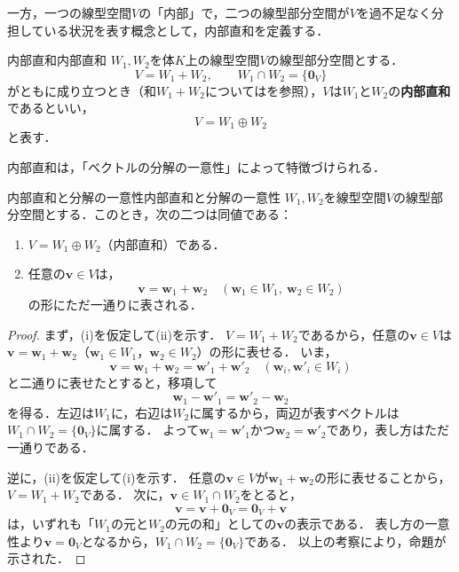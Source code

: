 一方，一つの線型空間$V$の「内部」で，二つの線型部分空間が$V$を過不足なく分担している状況を表す概念として，内部直和を定義する．

\begin{definition}{内部直和}{内部直和}
  $W_1, W_2$を体$K$上の線型空間$V$の線型部分空間とする．
  \[
    V = W_1 + W_2,
    \qquad
    W_1 \cap W_2 = \{\bm{0}_V\}
  \]
  がともに成り立つとき（和$W_1 + W_2$についてはを参照），$V$は$W_1$と$W_2$の\textbf{内部直和}であるといい，
  \[
    V = W_1 \oplus W_2
  \]
  と表す．
\end{definition}

内部直和は，「ベクトルの分解の一意性」によって特徴づけられる．

\begin{prop}{内部直和と分解の一意性}{内部直和と分解の一意性}
  $W_1, W_2$を線型空間$V$の線型部分空間とする．このとき，次の二つは同値である：
  \begin{enumerate}[label=(\roman*),leftmargin=3.2em]
    \item $V = W_1 \oplus W_2$（内部直和）である．
    \item 任意の$\bm{v} \in V$は，
    \[
      \bm{v} = \bm{w}_1 + \bm{w}_2
      \quad (\bm{w}_1 \in W_1,~ \bm{w}_2 \in W_2)
    \]
    の形にただ一通りに表される．
  \end{enumerate}
\end{prop}

\begin{leftbar}
\begin{proof}
  まず，(i)を仮定して(ii)を示す．
  $V = W_1 + W_2$であるから，任意の$\bm{v} \in V$は$\bm{v} = \bm{w}_1 + \bm{w}_2$（$\bm{w}_1 \in W_1$，$\bm{w}_2 \in W_2$）の形に表せる．
  いま，
  \[
    \bm{v} = \bm{w}_1 + \bm{w}_2 = \bm{w}'_1 + \bm{w}'_2
    \quad (\bm{w}_i, \bm{w}'_i \in W_i)
  \]
  と二通りに表せたとすると，移項して
  \[
    \bm{w}_1 - \bm{w}'_1 = \bm{w}'_2 - \bm{w}_2
  \]
  を得る．左辺は$W_1$に，右辺は$W_2$に属するから，両辺が表すベクトルは$W_1 \cap W_2 = \{\bm{0}_V\}$に属する．
  よって$\bm{w}_1 = \bm{w}'_1$かつ$\bm{w}_2 = \bm{w}'_2$であり，表し方はただ一通りである．

  逆に，(ii)を仮定して(i)を示す．
  任意の$\bm{v} \in V$が$\bm{w}_1 + \bm{w}_2$の形に表せることから，$V = W_1 + W_2$である．
  次に，$\bm{v} \in W_1 \cap W_2$をとると，
  \[
    \bm{v} = \bm{v} + \bm{0}_V = \bm{0}_V + \bm{v}
  \]
  は，いずれも「$W_1$の元と$W_2$の元の和」としての$\bm{v}$の表示である．
  表し方の一意性より$\bm{v} = \bm{0}_V$となるから，$W_1 \cap W_2 = \{\bm{0}_V\}$である．
  以上の考察により，命題が示された．
\end{proof}
\end{leftbar}

